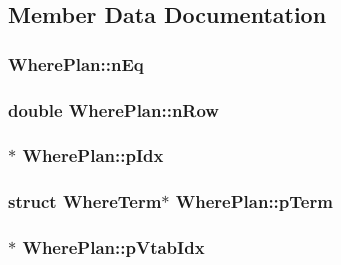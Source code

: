 \subsection{Member Data Documentation}
\hypertarget{struct_where_plan_a40932e9221e83032c43f147d287e3847}{
\subsubsection[{n\-Eq}]{ Where\-Plan\-::n\-Eq}}\label{struct_where_plan_a40932e9221e83032c43f147d287e3847}
\hypertarget{struct_where_plan_af32764f764b0d160c63eb730d9064f64}{
\subsubsection[{n\-Row}]{\setlength{\rightskip}{0pt plus 5cm}double Where\-Plan\-::n\-Row}}\label{struct_where_plan_af32764f764b0d160c63eb730d9064f64}
\hypertarget{struct_where_plan_a074ae9f009e0b2bf0a2121a30f959855}{
\subsubsection[{p\-Idx}]{$\ast$ Where\-Plan\-::p\-Idx}}\label{struct_where_plan_a074ae9f009e0b2bf0a2121a30f959855}
\hypertarget{struct_where_plan_a85501aa7df9d6e7bc4e867c71a7a8b7a}{
\subsubsection[{p\-Term}]{\setlength{\rightskip}{0pt plus 5cm}struct {\bf Where\-Term}$\ast$ Where\-Plan\-::p\-Term}}\label{struct_where_plan_a85501aa7df9d6e7bc4e867c71a7a8b7a}
\hypertarget{struct_where_plan_ac49d2637a631885c4c277d0ea35b14f8}{
\subsubsection[{p\-Vtab\-Idx}]{$\ast$ Where\-Plan\-::p\-Vtab\-Idx}}\label{struct_where_plan_ac49d2637a631885c4c277d0ea35b14f8}
